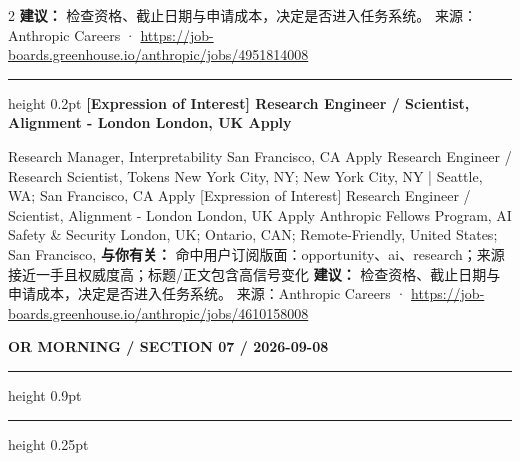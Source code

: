 \documentclass[10.5pt]{ctexart}
\begin{document}
\begin{multicols}{2}
\textbf{建议：} 检查资格、截止日期与申请成本，决定是否进入任务系统。
{\footnotesize\color{ormuted} 来源：Anthropic Careers · \url{https://job-boards.greenhouse.io/anthropic/jobs/4951814008}}
\vspace{2mm}
\hrule height 0.2pt
\vspace{2mm}
{\large\bfseries [Expression of Interest] Research Engineer / Scientist, Alignment - London London, UK Apply}\par
[Expression of Interest] Research Manager, Interpretability San Francisco, CA Apply Research Engineer / Research Scientist, Tokens New York City, NY; New York City, NY | Seattle, WA; San Francisco, CA Apply [Expression of Interest] Research Engineer / Scientist, Alignment - London London, UK Apply Anthropic Fellows Program, AI Safety \& Security London, UK; Ontario, CAN; Remote-Friendly, United States; San Francisco, 
\textbf{与你有关：} 命中用户订阅版面：opportunity、ai、research；来源接近一手且权威度高；标题/正文包含高信号变化
\textbf{建议：} 检查资格、截止日期与申请成本，决定是否进入任务系统。
{\footnotesize\color{ormuted} 来源：Anthropic Careers · \url{https://job-boards.greenhouse.io/anthropic/jobs/4610158008}}
\end{multicols}
\newpage
{\small\bfseries OR MORNING / SECTION 07 / 2026-09-08}
\vspace{2mm}
\hrule height 0.9pt
\vspace{1.5mm}
\hrule height 0.25pt
\vspace{4mm}
\end{document}
